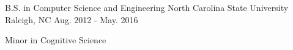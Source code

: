 

\begin{cventries}

  \cventry
    {B.S. in Computer Science and Engineering} %
    {North Carolina State University} %
    {Raleigh, NC} %
    {Aug. 2012 - May. 2016} %
    {
      \begin{cvitems} %
        \item {Minor in Cognitive Science}
      \end{cvitems}
    }

\end{cventries}
